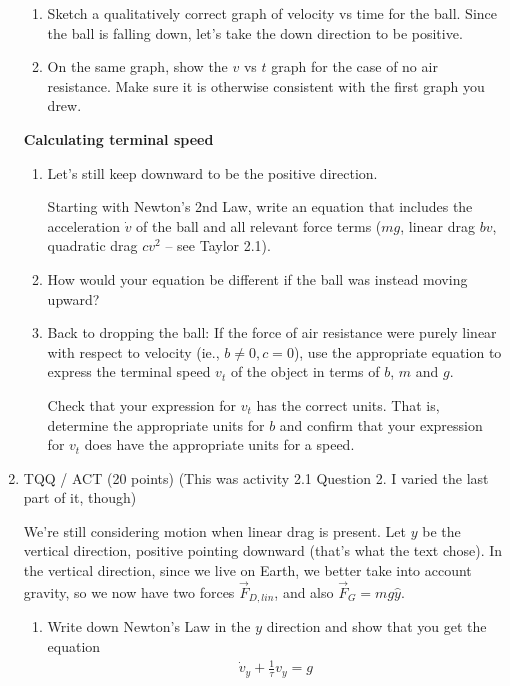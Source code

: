 \documentclass[12pt]{article}
\begin{document}
\begin{enumerate}
\begin{enumerate}
    \item Sketch a qualitatively correct graph of velocity vs time for the ball. Since the ball is falling down, let's take the down direction to be positive.

    \item
    On the same graph, show the $v$ vs $t$ graph for the case of no air resistance. Make sure it is otherwise consistent with the first graph you drew.

\end{enumerate}

\textbf{Calculating terminal speed}

\begin{enumerate}[resume]
    \item Let's still keep downward to be the positive direction.

    Starting with Newton's 2nd Law, write an equation that includes the acceleration $\dot v$ of the ball and all relevant force terms ($mg$, linear drag $bv$, quadratic drag $cv^2$ -- see Taylor 2.1).

    \item How would your equation be different if the ball was instead moving upward?

    \item Back to dropping the ball: If the force of air resistance were purely linear with respect to velocity (ie., $b \ne 0, c = 0$), use the appropriate equation to express the terminal speed $v_t$ of the object in terms of $b$, $m$ and $g$.

    Check that your expression for $v_t$ has the correct units. That is, determine the appropriate units for $b$ and confirm that your expression for $v_t$ does have the appropriate units for a speed.
\end{enumerate}

\item TQQ / ACT (20 points) (This was activity 2.1 Question 2. I varied the last part of it, though)

We're still considering motion when linear drag is present. Let $y$ be the vertical direction, positive pointing downward (that's what the text chose). In the vertical direction, since we live on Earth, we better take into account gravity, so we now have two forces $\vec F_{D,lin}$, and also $\vec F_G = mg \hat y$.

\begin{enumerate}
    \item Write down Newton's Law in the $y$ direction and show that you get the equation
    \begin{align}
        \dot v_y + \frac{1}{\tau} v_y = g
    \end{align}


\end{enumerate}
\end{enumerate}
\end{document}
